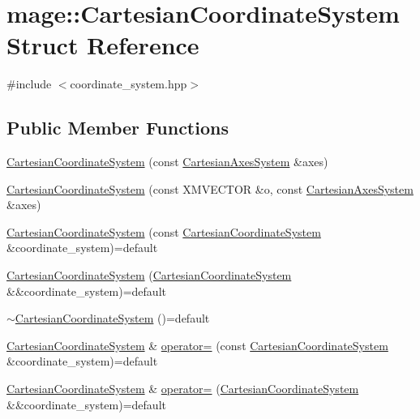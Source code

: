 \hypertarget{structmage_1_1_cartesian_coordinate_system}{}\section{mage\+:\+:Cartesian\+Coordinate\+System Struct Reference}
\label{structmage_1_1_cartesian_coordinate_system}


{\ttfamily \#include $<$coordinate\+\_\+system.\+hpp$>$}

\subsection*{Public Member Functions}
\begin{DoxyCompactItemize}
\item 
\hyperlink{structmage_1_1_cartesian_coordinate_system_a3f4a3309daccc818f06400a44f70b09b}{Cartesian\+Coordinate\+System} (const \hyperlink{structmage_1_1_cartesian_axes_system}{Cartesian\+Axes\+System} \&axes)
\item 
\hyperlink{structmage_1_1_cartesian_coordinate_system_a322dc634c9192c1d1f3f4872e6255b91}{Cartesian\+Coordinate\+System} (const X\+M\+V\+E\+C\+T\+OR \&o, const \hyperlink{structmage_1_1_cartesian_axes_system}{Cartesian\+Axes\+System} \&axes)
\item 
\hyperlink{structmage_1_1_cartesian_coordinate_system_a1f580b96edaae45356510208c187c1e2}{Cartesian\+Coordinate\+System} (const \hyperlink{structmage_1_1_cartesian_coordinate_system}{Cartesian\+Coordinate\+System} \&coordinate\+\_\+system)=default
\item 
\hyperlink{structmage_1_1_cartesian_coordinate_system_addc5cb01c6b990d1badb067da28e62bc}{Cartesian\+Coordinate\+System} (\hyperlink{structmage_1_1_cartesian_coordinate_system}{Cartesian\+Coordinate\+System} \&\&coordinate\+\_\+system)=default
\item 
\hyperlink{structmage_1_1_cartesian_coordinate_system_a86effcef63e455323c194063c0f1fd46}{$\sim$\+Cartesian\+Coordinate\+System} ()=default
\item 
\hyperlink{structmage_1_1_cartesian_coordinate_system}{Cartesian\+Coordinate\+System} \& \hyperlink{structmage_1_1_cartesian_coordinate_system_acf9dab4edc5c07b5bbf6bee0bdfe317c}{operator=} (const \hyperlink{structmage_1_1_cartesian_coordinate_system}{Cartesian\+Coordinate\+System} \&coordinate\+\_\+system)=default
\item 
\hyperlink{structmage_1_1_cartesian_coordinate_system}{Cartesian\+Coordinate\+System} \& \hyperlink{structmage_1_1_cartesian_coordinate_system_afc51347ff3f42576c483c76f5747c4c6}{operator=} (\hyperlink{structmage_1_1_cartesian_coordinate_system}{Cartesian\+Coordinate\+System} \&\&coordinate\+\_\+system)=default

\end{DoxyCompactItemize}
